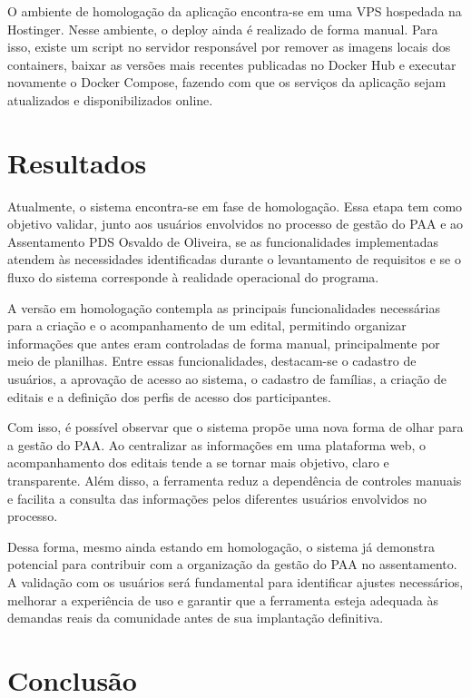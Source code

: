 \documentclass[grad,pdftex]{poli}
\begin{document}
O ambiente de homologação da aplicação encontra-se em uma VPS hospedada na Hostinger. Nesse ambiente, o deploy ainda é realizado de forma manual. Para isso, existe um script no servidor responsável por remover as imagens locais dos containers, baixar as versões mais recentes publicadas no Docker Hub e executar novamente o Docker Compose, fazendo com que os serviços da aplicação sejam atualizados e disponibilizados online.



\clearpage{}
    \clearpage{}\chapter{Resultados}
\label{chap6}

Atualmente, o sistema encontra-se em fase de homologação. Essa etapa tem como objetivo validar, junto aos usuários envolvidos no processo de gestão do PAA e ao Assentamento PDS Osvaldo de Oliveira, se as funcionalidades implementadas atendem às necessidades identificadas durante o levantamento de requisitos e se o fluxo do sistema corresponde à realidade operacional do programa.

A versão em homologação contempla as principais funcionalidades necessárias para a criação e o acompanhamento de um edital, permitindo organizar informações que antes eram controladas de forma manual, principalmente por meio de planilhas. Entre essas funcionalidades, destacam-se o cadastro de usuários, a aprovação de acesso ao sistema, o cadastro de famílias, a criação de editais e a definição dos perfis de acesso dos participantes.

Com isso, é possível observar que o sistema propõe uma nova forma de olhar para a gestão do PAA. Ao centralizar as informações em uma plataforma web, o acompanhamento dos editais tende a se tornar mais objetivo, claro e transparente. Além disso, a ferramenta reduz a dependência de controles manuais e facilita a consulta das informações pelos diferentes usuários envolvidos no processo.

Dessa forma, mesmo ainda estando em homologação, o sistema já demonstra potencial para contribuir com a organização da gestão do PAA no assentamento. A validação com os usuários será fundamental para identificar ajustes necessários, melhorar a experiência de uso e garantir que a ferramenta esteja adequada às demandas reais da comunidade antes de sua implantação definitiva.


\clearpage{}
    \clearpage{}\chapter{Conclusão}
\label{chap7}
\end{document}
